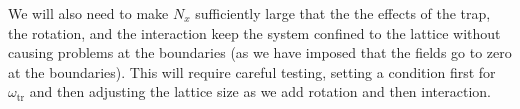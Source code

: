 \documentclass[../../RotatingBosons.tex]{subfiles}
\begin{document}
We will also need to make $N_{x}$ sufficiently large that the the effects of the trap, the rotation, and the interaction keep the system confined to the lattice without causing problems at the boundaries (as we have imposed that the fields go to zero at the boundaries). This will require careful testing, setting a condition first for $\omega_{\mathrm{tr}}$ and then adjusting the lattice size as we add rotation and then interaction.
\end{document}
